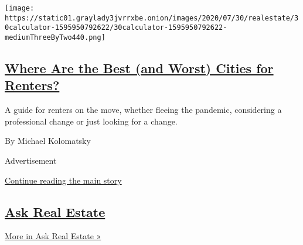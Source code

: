 \begin{enumerate}
  \texttt{[image: https://static01.graylady3jvrrxbe.onion/images/2020/07/30/realestate/30calculator-1595950792622/30calculator-1595950792622-mediumThreeByTwo440.png]}

  \hypertarget{where-are-the-best-and-worst-cities-for-renters}{%
  \subsection{\texorpdfstring{\href{/2020/07/30/realestate/best-worst-cities-for-renters-coronavirus-relocation.html}{Where
  Are the Best (and Worst) Cities for
  Renters?}}{Where Are the Best (and Worst) Cities for Renters?}}\label{where-are-the-best-and-worst-cities-for-renters}}

  A guide for renters on the move, whether fleeing the pandemic,
  considering a professional change or just looking for a change.

  By Michael Kolomatsky
\end{enumerate}

Advertisement

\protect\hyperlink{after-mid1}{Continue reading the main story}

\hypertarget{ask-real-estate-1}{%
\subsection{\texorpdfstring{\href{/column/ask-real-estate}{Ask Real
Estate}}{Ask Real Estate}}\label{ask-real-estate-1}}

\href{/column/ask-real-estate}{More in Ask Real Estate »}

